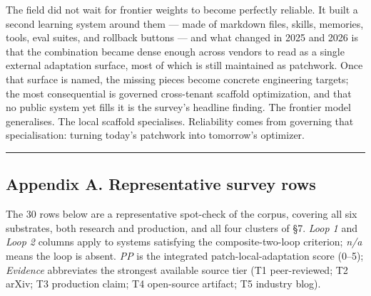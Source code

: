 The field did not wait for frontier weights to become perfectly
reliable. It built a second learning system around them --- made of
markdown files, skills, memories, tools, eval suites, and rollback
buttons --- and what changed in 2025 and 2026 is that the combination
became dense enough across vendors to read as a single external
adaptation surface, most of which is still maintained as patchwork. Once
that surface is named, the missing pieces become concrete engineering
targets; the most consequential is governed cross-tenant scaffold
optimization, and that no public system yet fills it is the survey's
headline finding. The frontier model generalises. The local scaffold
specialises. Reliability comes from governing that specialisation:
turning today's patchwork into tomorrow's optimizer.

\begin{center}\rule{0.5\linewidth}{0.5pt}\end{center}

\subsection{Appendix A. Representative survey
rows}\label{appendix-a.-representative-survey-rows}

The 30 rows below are a representative spot-check of the corpus,
covering all six substrates, both research and production, and all four
clusters of §7. \emph{Loop 1} and \emph{Loop 2} columns apply to systems
satisfying the composite-two-loop criterion; \emph{n/a} means the loop
is absent. \emph{PP} is the integrated patch-local-adaptation score
(0--5); \emph{Evidence} abbreviates the strongest available source tier
(T1 peer-reviewed; T2 arXiv; T3 production claim; T4 open-source
artifact; T5 industry blog).

\begingroup\small

